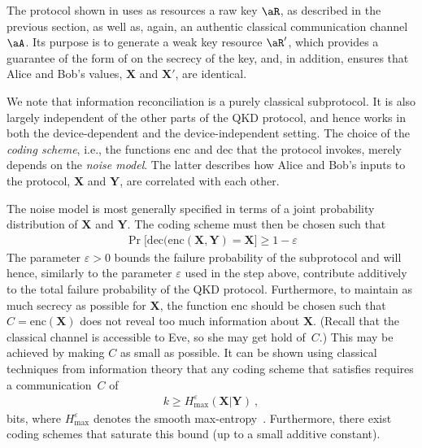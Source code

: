 The protocol shown in  uses as resources a raw key $\aR$, as described in the previous section, as well as, again, an authentic classical communication channel~$\aA$. Its purpose is to generate a weak key resource $\aR'$,  which provides a guarantee of the form of  on the secrecy of the key, and, in addition, ensures that  Alice and Bob's values, $\mathbf{X}$ and $\mathbf{X'}$, are identical. 

We note that information reconciliation is a purely classical subprotocol. It is also largely independent of the other parts of the QKD protocol, and hence  works in both the device-dependent and the device-independent setting. The choice of the \emph{coding scheme}, i.e., the functions $\mathrm{enc}$ and $\mathrm{dec}$ that the protocol invokes,  merely depends on the \emph{noise model}. The latter describes how  Alice and Bob's inputs to the protocol, $\mathbf{X}$ and $\mathbf{Y}$, are correlated with each other. 

The noise model is most generally specified in terms of a joint probability distribution of $\mathbf{X}$ and $\mathbf{Y}$. The coding scheme must then be chosen such that
\begin{align} \label{eq:decodingsuccess}
  \Pr\bigl[ \mathrm{dec}(\mathrm{enc}(\mathbf{X},\mathbf{Y}) = \mathbf{X}  \bigr] \geq 1-\varepsilon
\end{align}
The parameter $\varepsilon>0$  bounds the failure probability of the subprotocol and will hence, similarly to the parameter  $\varepsilon$ used in the step above,  contribute additively to the total failure probability of the QKD protocol. Furthermore, to maintain as much secrecy as possible for $\mathbf{X}$, the function $\mathrm{enc}$ should be chosen such that $C=\mathrm{enc}(\mathbf{X})$ does not reveal too much information about $\mathbf{X}$.  (Recall that the classical channel is accessible to Eve, so she may get hold of~$C$.) This may be achieved by making $C$ as small as possible. It can be shown using classical techniques from information theory that any coding scheme that satisfies  requires a communication~$C$ of
\begin{align} \label{eq:communicationbound}
  k \geq H^{\varepsilon}_{\max}(\mathbf{X} | \mathbf{Y}) \ ,
\end{align}
bits, where $H^{\varepsilon}_{\max}$ denotes the smooth max-entropy~\cite{RW05}. Furthermore, there exist coding schemes that saturate this bound (up to a small additive constant).  

